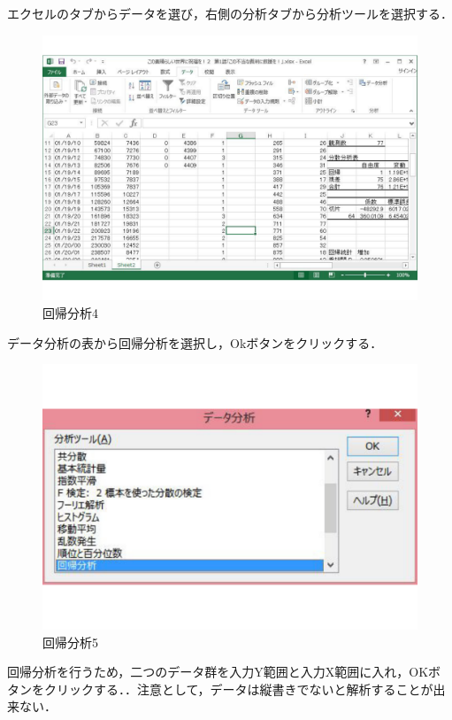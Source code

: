 エクセルのタブからデータを選び，右側の分析タブから分析ツールを選択する．

\begin{figure}[htb]
\centering
\includegraphics[width=14cm]{ekuseru05.pdf}
\caption{回帰分析4}\label{ace}
\end{figure}

\clearpage

データ分析の表から回帰分析を選択し，Okボタンをクリックする．

\begin{figure}[htb]
\centering
\includegraphics[width=14cm]{ekuseru06.pdf}
\caption{回帰分析5}\label{ace}
\end{figure}

\clearpage

回帰分析を行うため，二つのデータ群を入力Y範囲と入力X範囲に入れ，OKボタンをクリックする．．注意として，データは縦書きでないと解析することが出来ない．

